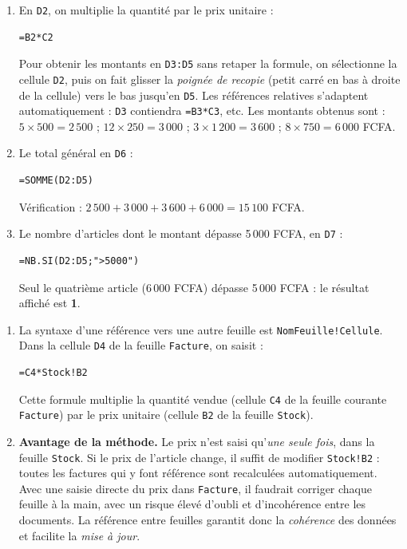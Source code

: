 \documentclass[11pt]{article}
\begin{document}
\begin{corrige}\tcblower
\begin{enumerate}
\item En \texttt{D2}, on multiplie la quantité par le prix unitaire :
\begin{lstlisting}
=B2*C2
\end{lstlisting}
Pour obtenir les montants en \texttt{D3:D5} sans retaper la formule, on sélectionne la cellule \texttt{D2}, puis on fait glisser la \emph{poignée de recopie} (petit carré en bas à droite de la cellule) vers le bas jusqu'en \texttt{D5}. Les références relatives s'adaptent automatiquement : \texttt{D3} contiendra \texttt{=B3*C3}, etc. Les montants obtenus sont : $5 \times 500 = 2\,500$ ; $12 \times 250 = 3\,000$ ; $3 \times 1\,200 = 3\,600$ ; $8 \times 750 = 6\,000$ FCFA.
\item Le total général en \texttt{D6} :
\begin{lstlisting}
=SOMME(D2:D5)
\end{lstlisting}
Vérification : $2\,500 + 3\,000 + 3\,600 + 6\,000 = 15\,100$ FCFA.
\item Le nombre d'articles dont le montant dépasse 5\,000 FCFA, en \texttt{D7} :
\begin{lstlisting}
=NB.SI(D2:D5;">5000")
\end{lstlisting}
Seul le quatrième article (6\,000 FCFA) dépasse 5\,000 FCFA : le résultat affiché est \textbf{1}.
\end{enumerate}
\end{corrige}

\begin{corrige}\tcblower
\begin{enumerate}
\item La syntaxe d'une référence vers une autre feuille est \texttt{NomFeuille!Cellule}. Dans la cellule \texttt{D4} de la feuille \texttt{Facture}, on saisit :
\begin{lstlisting}
=C4*Stock!B2
\end{lstlisting}
Cette formule multiplie la quantité vendue (cellule \texttt{C4} de la feuille courante \texttt{Facture}) par le prix unitaire (cellule \texttt{B2} de la feuille \texttt{Stock}).
\item \textbf{Avantage de la méthode.} Le prix n'est saisi qu'\emph{une seule fois}, dans la feuille \texttt{Stock}. Si le prix de l'article change, il suffit de modifier \texttt{Stock!B2} : toutes les factures qui y font référence sont recalculées automatiquement. Avec une saisie directe du prix dans \texttt{Facture}, il faudrait corriger chaque feuille à la main, avec un risque élevé d'oubli et d'incohérence entre les documents. La référence entre feuilles garantit donc la \emph{cohérence} des données et facilite la \emph{mise à jour}.
\end{enumerate}
\end{corrige}
\end{document}
